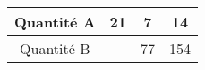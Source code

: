 \begin{tabular}{|c|c|c|c|}
\hline
Quantité A & 21 & 7 & 14 \\ \hline
Quantité B & \kern1cm & 77 & 154 \\ \hline
\end{tabular}

